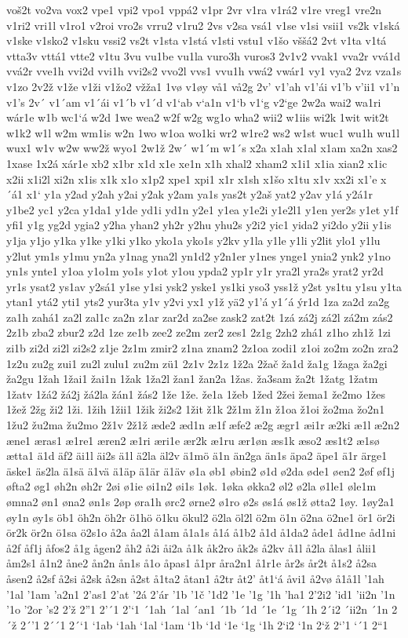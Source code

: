 voš2t
vo2va
vox2
vpe1
vpi2
vpo1
vppá2
v1pr
2vr
v1ra
v1rá2
v1re
vreg1
vre2n
v1ri2
vri1l
v1ro1
v2roi
vro2s
vrru2
v1ru2
2vs
v2sa
vsá1
v1se
v1si
vsii1
vs2k
v1ská
v1ske
v1sko2
v1sku
vssi2
vs2t
v1sta
v1stá
v1sti
vstu1
v1šo
vššá2
2vt
v1ta
v1tá
vtta3v
vttá1
vtte2
v1tu
3vu
vu1be
vu1la
vuro3h
vuros3
2v1v2
vvak1
vva2r
vvá1d
vvá2r
vve1h
vvi2d
vvi1h
vvi2s2
vvo2l
vvs1
vvu1h
vwá2
vwár1
vy1
vya2
2vz
vza1s
v1zo
2v2ž
v1že
v1ži
v1žo2
vžža1
1vø
v1øy
vå1
vå2g
2v'
v1'ah
v1'ái
v1'b
v'ii1
v1'n
v1's
2v´
v1´am
v1´ái
v1´b
v1´d
v1`ab
v`a1n
v1`b
v1`g
v2`ge
2w2a
wai2
wa1ri
wár1e
w1b
wc1`á
w2d
1we
wea2
w2f
w2g
wg1o
wha2
wii2
w1iis
wi2k
1wit
wit2t
w1k2
w1l
w2m
wm1is
w2n
1wo
w1oa
wo1ki
wr2
w1re2
ws2
w1st
wuc1
wu1h
wu1l
wux1
w1v
w2w
ww2ž
wyo1
2w1ž
2w´
w1´m
w1´s
x2a
x1ah
x1al
x1am
xa2n
xas2
1xase
1x2á
xár1e
xb2
x1br
x1d
x1e
xe1n
x1h
xhal2
xham2
x1i1
x1ia
xian2
x1ic
x2ii
x1i2l
xi2n
x1is
x1k
x1o
x1p2
xpe1
xpi1
x1r
x1sh
x1šo
x1tu
x1v
xx2i
x1'e
x´á1
x1`
y1a
y2ad
y2ah
y2ai
y2ak
y2am
ya1s
yas2t
y2aš
yat2
y2av
y1á
y2á1r
y1be2
yc1
y2ca
y1da1
y1de
yd1i
yd1n
y2e1
y1ea
y1e2i
y1e2l1
y1en
yer2s
y1et
y1f
yfi1
y1g
yg2d
ygia2
y2ha
yhan2
yh2r
y2hu
yhu2s
y2i2
yic1
yida2
yi2do
y2ii
y1is
y1ja
y1jo
y1ka
y1ke
y1ki
y1ko
yko1a
yko1s
y2kv
y1la
y1le
y1li
y2lit
ylo1
y1lu
y2lut
ym1s
y1mu
yn2a
y1nag
yna2l
yn1d2
y2n1er
y1nes
ynge1
ynia2
ynk2
y1no
yn1s
ynte1
y1oa
y1o1m
yo1s
y1ot
y1ou
ypda2
yp1r
y1r
yra2l
yra2s
yrat2
yr2d
yr1s
ysat2
ys1av
y2sá1
y1se
y1si
ysk2
yske1
ys1ki
yso3
yss1ž
y2st
ys1tu
y1su
y1ta
ytan1
ytá2
yti1
yts2
yur3ta
y1v
y2vi
yx1
y1ž
yä2
y1'á
y1´á
ýr1d
1za
za2d
za2g
za1h
zahá1
za2l
zal1c
za2n
z1ar
zar2d
za2se
zask2
zat2t
1zá
zá2j
zá2l
zá2m
zás2
2z1b
zba2
zbur2
z2d
1ze
ze1b
zee2
ze2m
zer2
zes1
2z1g
2zh2
zhá1
z1ho
zh1ž
1zi
zi1b
zi2d
zi2l
zi2s2
z1je
2z1m
zmir2
z1na
znam2
2z1oa
zodi1
z1oi
zo2m
zo2n
zra2
1z2u
zu2g
zui1
zu2l
zulu1
zu2m
zü1
2z1v
2z1z
1ž2a
2žač
ža1d
ža1g
1žaga
ža2gi
ža2gu
1žah
1žai1
žai1n
1žak
1ža2l
žan1
žan2a
1žas.
ža3sam
ža2t
1žatg
1žatm
1žatv
1žá2
žá2j
žá2la
žán1
žás2
1že
1že.
že1a
1žeb
1žed
2žei
žema1
že2mo
1žes
1žež
2žg
ži2
1ži.
1žih
1žii1
1žik
ži2s2
1žit
ž1k
2ž1m
ž1n
ž1oa
ž1oi
žo2ma
žo2n1
1žu2
žu2ma
žu2mo
2ž1v
2ž1ž
æde2
æd1n
æ1f
æfe2
æ2g
ægr1
æi1r
æ2ki
æ1l
æ2n2
æne1
æras1
æ1re1
æren2
æ1ri
æri1e
ær2k
æ1ru
ær1øn
æs1k
æso2
æs1t2
æ1sø
ætta1
ä1d
äf2
äi1l
äi2s
ä1l
ä2la
äl2v
ä1mö
ä1n
än2ga
än1s
äpa2
äpe1
ä1r
ärge1
äske1
äs2la
ä1sä
ä1vä
ä1äp
ä1är
ä1äv
ø1a
øb1
øbin2
ø1d
ø2da
øde1
øen2
2øf
øf1j
øfta2
øg1
øh2n
øh2r
2øi
ø1ie
øi1n2
øi1s
1øk.
1øka
økka2
øl2
ø2la
ø1le1
øle1m
ømna2
øn1
øna2
øn1s
2øp
øra1h
ørc2
ørne2
ø1ro
ø2s
øs1á
øs1ž
øtta2
1øy.
1øy2a1
øy1n
øy1s
öb1
öh2n
öh2r
ö1hö
ö1ku
ökul2
ö2la
öl2l
ö2m
ö1n
ö2na
ö2ne1
ör1
ör2i
ör2k
ör2n
ö1sa
ö2s1o
å2a
åa2l
å1am
å1a1s
å1á
å1b2
å1d
å1da2
åde1
åd1ne
åd1ni
å2f
åf1j
åfos2
å1g
ågen2
åh2
å2i
åi2a
å1k
åk2ro
åk2s
å2kv
å1l
å2la
ålas1
ålii1
åm2s1
å1n2
åne2
ån2n
ån1s
å1o
åpas1
å1pr
åra2n1
å1r1e
år2s
år2t
å1s2
å2sa
åsen2
å2sf
å2si
å2sk
å2sn
å2st
å1ta2
åtan1
å2tr
åt2'
åt1`á
åvi1
å2vø
å1å1l
'1ah
'1al
'1am
'a2n1
2'as1
2'at
'2á
2'ár
'1b
'1č
'1d2
'1e
'1g
'1h
'ha1
2'2i2
'id1
'ii2n
'1n
'1o
'2or
's2
2'ž
2''1
2'´1
2'`1
´1ah
´1al
´an1
´1b
´1d
´1e
´1g
´1h
2´i2
´ii2n
´1n
2´ž
2´'1
2´´1
2´`1
`1ab
`1ah
`1al
`1am
`1b
`1d
`1e
`1g
`1h
2`i2
`1n
2`ž
2`'1
`´1
2``1
